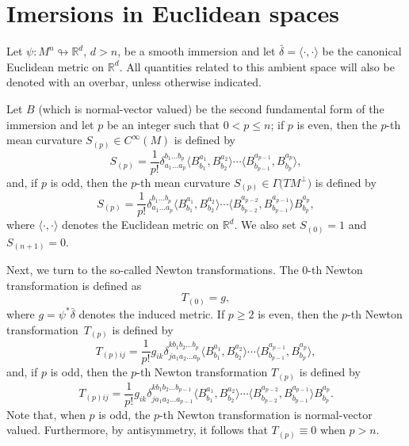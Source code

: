 \documentclass[pdftex]{sigma}
\numberwithin{equation}{section}
\begin{document}
\section{Imersions in Euclidean spaces}

Let $\psi\colon  M^n \looparrowright \mathbb{R}^d$, $d > n$, be a smooth immersion and
let \(\bar{\delta} = \langle \cdot , \cdot \rangle\) be the canonical Euclidean
metric on \(\mathbb{R}^d\). All quantities related to this ambient space will
also be denoted with an overbar, unless otherwise indicated.

Let $B$ (which is normal-vector valued) be the second fundamental form
of the immersion and let $p$ be an integer such that $0 < p \leq n$; if $p$
is even, then the $p$-th mean curvature $S_{(p)} \in C^\infty(M)$ is defined by
\begin{equation*}
   {S}_{(p)} = \frac{1}{p!} \delta_{a_1 \ldots a_p}^{b_1 \ldots b_p}
   \bigl\langle B_{b_1}^{a_1}, B_{b_2}^{a_2} \bigr\rangle \cdots \bigl\langle B_{b_{p-1}}^{a_{p-1}}, B_{b_p}^{a_p} \bigr\rangle,
\end{equation*}
and, if $p$ is odd, then the $p$-th mean curvature $S_{(p)} \in {\Gamma\bigl(TM^{\perp}\bigr)}$ is defined by
\begin{equation*}
   {S}_{(p)} = \frac{1}{p!} \delta_{a_1 \ldots a_p}^{b_1 \ldots b_p}
   \bigl\langle B_{b_1}^{a_1}, B_{b_2}^{a_2} \bigr\rangle \cdots \bigl\langle B_{b_{p-2}}^{a_{p-2}}, B_{b_{p-1}}^{a_{p-1}} \bigr\rangle B_{b_p}^{a_p},
\end{equation*}
where $\langle \cdot , \cdot \rangle$ denotes the Euclidean metric on $\mathbb{R}^d$.
We also set $S_{(0)} = 1$ and $S_{(n+1)} = 0$.

Next, we turn to the so-called Newton transformations. The \(0\)-th Newton transformation is defined as
\begin{equation*}
  T_{(0)} = g,
\end{equation*}
where \(g = \psi^\ast \bar{\delta}\) denotes the induced metric. If $p \geq 2$ is even,
then the $p$-th Newton transformation~$T_{(p)}$ is defined by
\begin{equation} \label{NT for even p}
T_{(p)ij} = \frac{1}{p!}g_{ik}\delta_{ja_1a_2\ldots a_p}^{kb_1b_2\ldots b_p}\bigl\langle B_{b_1}^{a_1}, B_{b_2}^{a_2} \bigr\rangle \cdots \bigl\langle B_{b_{p-1}}^{a_{p-1}}, B_{b_p}^{a_p} \bigr\rangle,
\end{equation}
and, if $p$ is odd, then the $p$-th Newton transformation $T_{(p)}$ is defined by
\begin{equation*}
T_{(p)ij} = \frac{1}{p!}g_{ik}\delta_{ja_1a_2\ldots a_{p-1}}^{kb_1b_2\ldots b_{p-1}}\bigl\langle B_{b_1}^{a_1}, B_{b_2}^{a_2} \bigr\rangle \cdots \bigl\langle B_{b_{p-2}}^{a_{p-2}}, B_{b_{p-1}}^{a_{p-1}}\bigr\rangle B_{b_p}^{a_p}.
\end{equation*}
Note that, when \(p\) is odd, the \(p\)-th Newton transformation is normal-vector
valued. Furthermore, by antisymmetry, it follows that \(T_{(p)} \equiv 0\)
when \(p > n\).
\end{document}
